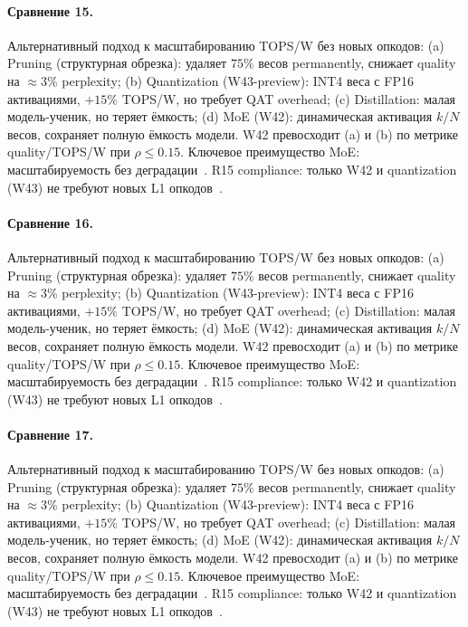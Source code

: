 \paragraph{Сравнение 15.} Альтернативный подход к масштабированию TOPS/W без новых опкодов: (a) Pruning (структурная обрезка): удаляет $75\%$ весов permanently, снижает quality на $\approx 3\%$ perplexity; (b) Quantization (W43-preview): INT4 веса с FP16 активациями, $+15\%$ TOPS/W, но требует QAT overhead; (c) Distillation: малая модель-ученик, но теряет ёмкость; (d) MoE (W42): динамическая активация $k/N$ весов, сохраняет полную ёмкость модели. W42 превосходит (a) и (b) по метрике quality/TOPS/W при $\rho \leq 0{.}15$. Ключевое преимущество MoE: масштабируемость без деградации~\cite{switch_transformer2021,mixtral2024}. R15 compliance: только W42 и quantization (W43) не требуют новых L1 опкодов~\cite{lee_gvsu_proof2021}.

\paragraph{Сравнение 16.} Альтернативный подход к масштабированию TOPS/W без новых опкодов: (a) Pruning (структурная обрезка): удаляет $75\%$ весов permanently, снижает quality на $\approx 3\%$ perplexity; (b) Quantization (W43-preview): INT4 веса с FP16 активациями, $+15\%$ TOPS/W, но требует QAT overhead; (c) Distillation: малая модель-ученик, но теряет ёмкость; (d) MoE (W42): динамическая активация $k/N$ весов, сохраняет полную ёмкость модели. W42 превосходит (a) и (b) по метрике quality/TOPS/W при $\rho \leq 0{.}15$. Ключевое преимущество MoE: масштабируемость без деградации~\cite{switch_transformer2021,mixtral2024}. R15 compliance: только W42 и quantization (W43) не требуют новых L1 опкодов~\cite{lee_gvsu_proof2021}.

\paragraph{Сравнение 17.} Альтернативный подход к масштабированию TOPS/W без новых опкодов: (a) Pruning (структурная обрезка): удаляет $75\%$ весов permanently, снижает quality на $\approx 3\%$ perplexity; (b) Quantization (W43-preview): INT4 веса с FP16 активациями, $+15\%$ TOPS/W, но требует QAT overhead; (c) Distillation: малая модель-ученик, но теряет ёмкость; (d) MoE (W42): динамическая активация $k/N$ весов, сохраняет полную ёмкость модели. W42 превосходит (a) и (b) по метрике quality/TOPS/W при $\rho \leq 0{.}15$. Ключевое преимущество MoE: масштабируемость без деградации~\cite{switch_transformer2021,mixtral2024}. R15 compliance: только W42 и quantization (W43) не требуют новых L1 опкодов~\cite{lee_gvsu_proof2021}.

